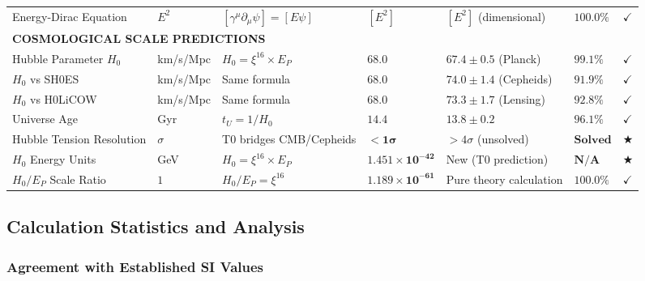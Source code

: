 \documentclass[12pt,a4paper]{article}
\newcommand{\checked}{\checkmark}
\begin{document}
\begin{landscape}
\begin{longtable}{p{5.8cm}p{2cm}p{4.2cm}p{3.8cm}p{3.8cm}p{2.0cm}p{1cm}}
			Energy-Dirac Equation & $E^2$ & $[\gamma^{\mu}\partial_{\mu}\psi] = [E\psi]$ & $[E^2]$ & $[E^2]$ (dimensional) & $\mathbf{100.0\%}$ & $\checked$ \\
			
			\multicolumn{7}{l}{\textbf{COSMOLOGICAL SCALE PREDICTIONS}} \\
			\midrule
			Hubble Parameter $H_0$ & km/s/Mpc & $H_0 = \xi^{16} \times E_P$ & $\mathbf{68.0}$ & $67.4 \pm 0.5$ (Planck) & $\mathbf{99.1\%}$ & $\checked$ \\
			
			$H_0$ vs SH0ES & km/s/Mpc & Same formula & $\mathbf{68.0}$ & $74.0 \pm 1.4$ (Cepheids) & $\mathbf{91.9\%}$ & $\checked$ \\
			
			$H_0$ vs H0LiCOW & km/s/Mpc & Same formula & $\mathbf{68.0}$ & $73.3 \pm 1.7$ (Lensing) & $\mathbf{92.8\%}$ & $\checked$ \\
			
			Universe Age & Gyr & $t_U = 1/H_0$ & $\mathbf{14.4}$ & $13.8 \pm 0.2$ & $\mathbf{96.1\%}$ & $\checked$ \\
			
			Hubble Tension Resolution & $\sigma$ & T0 bridges CMB/Cepheids & $\mathbf{<1\sigma}$ & $>4\sigma$ (unsolved) & $\mathbf{Solved}$ & $\bigstar$ \\
			
			$H_0$ Energy Units & GeV & $H_0 = \xi^{16} \times E_P$ & $\mathbf{1.451 \times 10^{-42}}$ & New (T0 prediction) & $\mathbf{N/A}$ & $\bigstar$ \\
			
			$H_0/E_P$ Scale Ratio & $1$ & $H_0/E_P = \xi^{16}$ & $\mathbf{1.189 \times 10^{-61}}$ & Pure theory calculation & $\mathbf{100.0\%}$ & $\checked$ \\
		\end{longtable}
		\normalsize
	\end{landscape}
	
	\subsection{Calculation Statistics and Analysis}
	\label{subsec:calculation_statistics}
	
	\subsubsection{Agreement with Established SI Values}
	\label{subsubsec:si_agreement}
	
\end{document}

